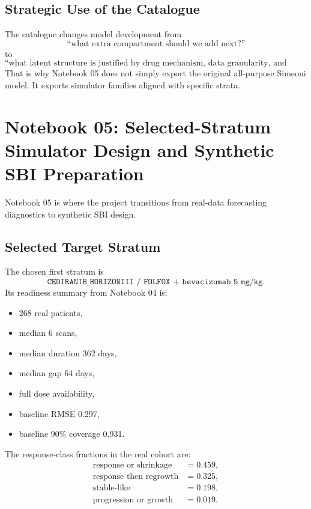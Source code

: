 \documentclass[11pt,a4paper]{article}
\begin{document}
\subsection{Strategic Use of the Catalogue}

The catalogue changes model development from
\[
    \text{``what extra compartment should we add next?''}
\]
to
\[
    \text{``what latent structure is justified by drug mechanism, data granularity, and identifiability?''}
\]
That is why Notebook 05 does not simply export the original all-purpose Simeoni model. It exports simulator families aligned with specific strata.

\section{Notebook 05: Selected-Stratum Simulator Design and Synthetic SBI Preparation}

Notebook 05 is where the project transitions from real-data forecasting diagnostics to synthetic SBI design.

\subsection{Selected Target Stratum}

The chosen first stratum is
\[
    \texttt{CEDIRANIB\_HORIZONIII / FOLFOX + bevacizumab 5 mg/kg}.
\]
Its readiness summary from Notebook 04 is:
\begin{itemize}[leftmargin=2em]
    \item 268 real patients,
    \item median 6 scans,
    \item median duration 362 days,
    \item median gap 64 days,
    \item full dose availability,
    \item baseline RMSE 0.297,
    \item baseline 90\% coverage 0.931.
\end{itemize}

The response-class fractions in the real cohort are:
\[
\begin{aligned}
    \text{response or shrinkage} &= 0.459,\\
    \text{response then regrowth} &= 0.325,\\
    \text{stable-like} &= 0.198,\\
    \text{progression or growth} &= 0.019.
\end{aligned}
\]
\end{document}

